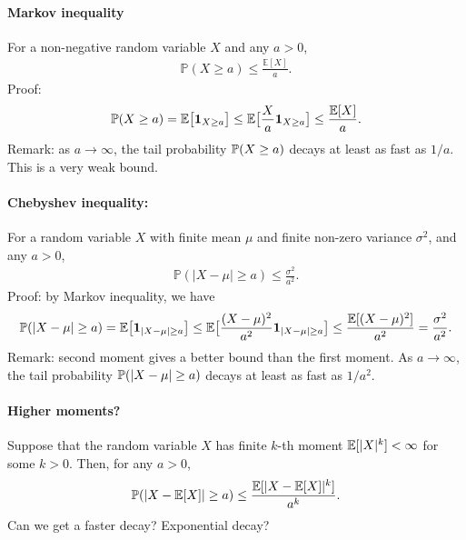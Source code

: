 \documentclass[11pt,letterpaper]{article}
\begin{document}
\paragraph{Markov inequality}
For a non-negative random variable $X$ and any $a > 0$,
\begin{align*}
  \mathbb{P}(X \geq a) \leq \frac{\mathbb{E}[X]}{a}.
\end{align*}
Proof: 
\begin{align*}
  {\mathbb{P}} (X \geq a) = {\mathbb{E}} \big[ \bm{1}_{X \geq a} \big] \leq {\mathbb{E}} \big[ \frac{X}{a} \bm{1}_{X \geq a} \big] \leq \frac{{\mathbb{E}} [X]}{a}.
\end{align*}
Remark: as $a \rightarrow \infty$, the tail probability ${\mathbb{P}} (X \geq a)$ decays at least as fast as $1/a$. This is a very weak bound.

\paragraph{Chebyshev inequality:}
For a random variable $X$ with finite mean $\mu$ and finite non-zero variance $\sigma^2$, and any $a > 0$,
\begin{align*}
  \mathbb{P}(|X - \mu| \geq a) \leq \frac{\sigma^2}{a^2}.
\end{align*}
Proof: by Markov inequality, we have
\begin{align*}
  {\mathbb{P}} (|X - \mu| \geq a) = {\mathbb{E}} \big[ \bm{1}_{|X - \mu| \geq a} \big] \leq {\mathbb{E}} \big[ \frac{(X - \mu)^2}{a^2} \bm{1}_{|X - \mu| \geq a} \big] \leq \frac{{\mathbb{E}} [(X - \mu)^2]}{a^2} = \frac{\sigma^2}{a^2}.
\end{align*}
Remark: second moment gives a better bound than the first moment. As $a \rightarrow \infty$, the tail probability ${\mathbb{P}} (|X - \mu| \geq a)$ decays at least as fast as $1/a^2$.

\paragraph{Higher moments?} Suppose that the random variable $X$ has finite $k$-th moment ${\mathbb{E}}[|X|^k] < \infty$ for some $k > 0$. Then, for any $a > 0$,
\begin{align*}
  {\mathbb{P}} (|X - {\mathbb{E}} [X] | \geq a) \leq \frac{{\mathbb{E}} [|X - {\mathbb{E}} [X]|^k]}{a^k}.
\end{align*}
Can we get a faster decay? Exponential decay?
\end{document}
